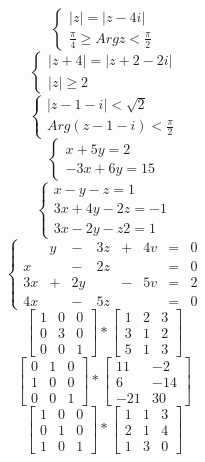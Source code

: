 \documentclass[10pt]{article}
\begin{document}
$$ 
\begin{cases} 
|z|=|z-4i| \\
\frac{\pi}{4} \geq Arg z<\frac{\pi}{2}
\end{cases}
$$
$$ 
\begin{cases} 
|z+4|=|z+2-2i| \\
|z| \geq 2
\end{cases}
$$
$$ 
\begin{cases} 
|z-1-i|<\sqrt{2} \\
Arg(z-1-i)<\frac{\pi}{2}
\end{cases}
$$
$$ 
\begin{cases} 
x+5y = 2\\
-3x+6y=15
\end{cases}
$$
$$ 
\begin{cases} 
x-y-z = 1\\
3x+4y-2z=-1\\
3x-2y-z2= 1
\end{cases}
$$
$$
\left\{\begin{array} {ccccccccc}
&y&-&3z&+&4v&=&0\\
x && -&2z&&&=&0\\
3x&+&2y&&- &5v&=&2\\
4x&& - &5z&& &=&0
\end{array}\right.
$$
$$
\left[\begin{array} {ccccc}
1& 0& 0\\
0 &3 &0\\
0 &0& 1
\end{array}\right]
* \left[\begin{array} {ccccccc}
1& 2& 3\\
3 &1 &2\\
5 &1& 3
\end{array}\right]
$$
$$
\left[\begin{array} {ccccc}
0& 1& 0\\
1 &0 &0\\
0 &0& 1
\end{array}\right]
* \left[\begin{array} {ccccccc}
11& -2\\
6 &-14 \\
-21 &30
\end{array}\right]
$$
$$
\left[\begin{array} {ccccc}
1& 0& 0\\
0 &1 &0\\
1 &0& 1
\end{array}\right]
* \left[\begin{array} {ccccccc}
1&1& 3\\
2 &1&4 \\
1&3&0
\end{array}\right]
$$
\end{document}
